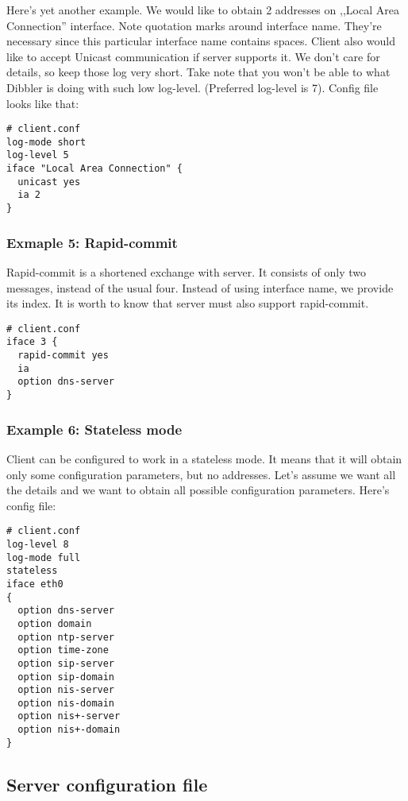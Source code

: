 Here's yet another example. We would like to obtain 2 addresses on
,,Local Area Connection'' interface. Note quotation marks around
interface name. They're necessary since this particular interface name
contains spaces. Client also would like to accept Unicast
communication if server supports it. We don't care for
details, so keep those log very short. Take note that you won't be
able to what Dibbler is doing with such low log-level. (Preferred
log-level is 7). Config file looks like that:

\begin{verbatim}
# client.conf
log-mode short
log-level 5
iface "Local Area Connection" {
  unicast yes
  ia 2
}
\end{verbatim}

\subsubsection{Exmaple 5: Rapid-commit}
Rapid-commit is a shortened exchange with server. It consists of only
two messages, instead of the usual four. Instead of using interface
name, we provide its index. It is worth to know that server must also 
support rapid-commit.

\begin{verbatim}
# client.conf
iface 3 {
  rapid-commit yes
  ia 
  option dns-server
}
\end{verbatim}

\subsubsection{Example 6: Stateless mode}
Client can be configured to work in a stateless mode. It means that it
will obtain only some configuration parameters, but no
addresses. Let's assume we want all the details and we want to obtain
all possible configuration parameters. Here's config file:

\begin{verbatim}
# client.conf
log-level 8
log-mode full
stateless
iface eth0
{
  option dns-server
  option domain
  option ntp-server
  option time-zone
  option sip-server
  option sip-domain
  option nis-server
  option nis-domain
  option nis+-server
  option nis+-domain
}
\end{verbatim}

\subsection{Server configuration file}

